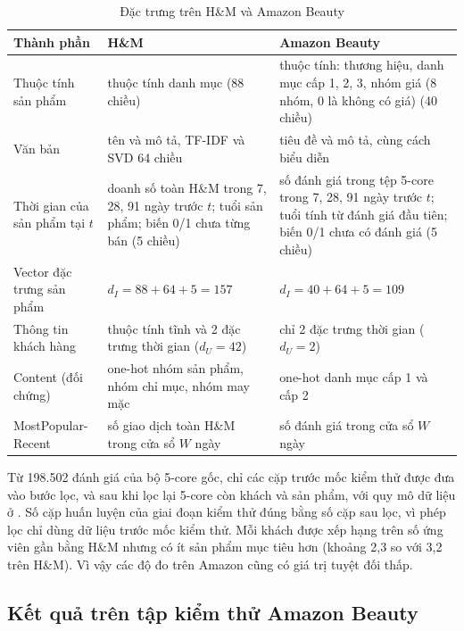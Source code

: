 \begin{table}[H]
    \centering\small
    \caption{Đặc trưng trên H\&M và Amazon Beauty}
    \label{tab:amazon_features}
    \begin{tabularx}{\textwidth}{|>{\raggedright\arraybackslash}p{3.0cm}|>{\raggedright\arraybackslash}X|>{\raggedright\arraybackslash}X|}
        \hline
        Thành phần & H\&M & Amazon Beauty \\
        \hline
        Thuộc tính sản phẩm & 11 thuộc tính danh mục (88 chiều) & 5 thuộc tính: thương hiệu, danh mục cấp 1, 2, 3, nhóm giá (8 nhóm, 0 là không có giá) (40 chiều) \\ \hline
        Văn bản & tên và mô tả, TF-IDF và SVD 64 chiều & tiêu đề và mô tả, cùng cách biểu diễn \\ \hline
        Thời gian của sản phẩm tại $t$ & doanh số toàn H\&M trong 7, 28, 91 ngày trước $t$; tuổi sản phẩm; biến 0/1 chưa từng bán (5 chiều) & số đánh giá trong tệp 5-core trong 7, 28, 91 ngày trước $t$; tuổi tính từ đánh giá đầu tiên; biến 0/1 chưa có đánh giá (5 chiều) \\ \hline
        Vector đặc trưng sản phẩm & $d_I = 88 + 64 + 5 = 157$ & $d_I = 40 + 64 + 5 = 109$ \\ \hline
        Thông tin khách hàng & 5 thuộc tính tĩnh và 2 đặc trưng thời gian ($d_U = 42$) & chỉ 2 đặc trưng thời gian ($d_U = 2$) \\ \hline
        Content (đối chứng) & one-hot nhóm sản phẩm, nhóm chỉ mục, nhóm may mặc & one-hot danh mục cấp 1 và cấp 2 \\ \hline
        MostPopular-Recent & số giao dịch toàn H\&M trong cửa sổ $W$ ngày & số đánh giá trong cửa sổ $W$ ngày \\
        \hline
    \end{tabularx}
\end{table}

Từ 198.502 đánh giá của bộ 5-core gốc, chỉ các cặp trước mốc kiểm thử được đưa vào bước lọc, và sau khi lọc lại 5-core còn  khách và  sản phẩm, với quy mô dữ liệu ở . Số cặp huấn luyện của giai đoạn kiểm thử đúng bằng số cặp sau lọc, vì phép lọc chỉ dùng dữ liệu trước mốc kiểm thử. Mỗi khách được xếp hạng trên số ứng viên gần bằng H\&M nhưng có ít sản phẩm mục tiêu hơn (khoảng 2,3 so với 3,2 trên H\&M). Vì vậy các độ đo trên Amazon cũng có giá trị tuyệt đối thấp.


\subsection{Kết quả trên tập kiểm thử Amazon Beauty}
\label{subsec:amazon_main}

